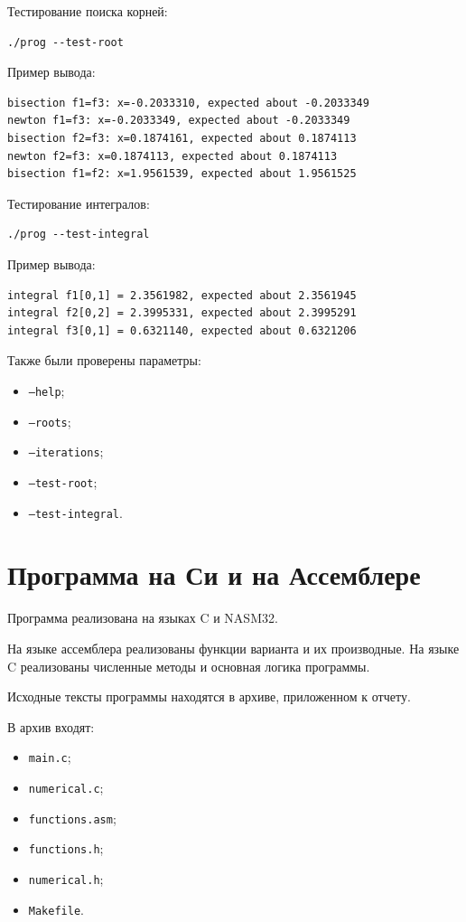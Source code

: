 \documentclass[a4paper,12pt]{article}
\begin{document}
Тестирование поиска корней:
\begin{lstlisting}
./prog --test-root
\end{lstlisting}

Пример вывода:
\begin{lstlisting}
bisection f1=f3: x=-0.2033310, expected about -0.2033349
newton f1=f3: x=-0.2033349, expected about -0.2033349
bisection f2=f3: x=0.1874161, expected about 0.1874113
newton f2=f3: x=0.1874113, expected about 0.1874113
bisection f1=f2: x=1.9561539, expected about 1.9561525
\end{lstlisting}

Тестирование интегралов:
\begin{lstlisting}
./prog --test-integral
\end{lstlisting}

Пример вывода:
\begin{lstlisting}
integral f1[0,1] = 2.3561982, expected about 2.3561945
integral f2[0,2] = 2.3995331, expected about 2.3995291
integral f3[0,1] = 0.6321140, expected about 0.6321206
\end{lstlisting}

Также были проверены параметры:
\begin{itemize}
    \item \texttt{--help};
    \item \texttt{--roots};
    \item \texttt{--iterations};
    \item \texttt{--test-root};
    \item \texttt{--test-integral}.
\end{itemize}

\newpage
\section{Программа на Си и на Ассемблере}
Программа реализована на языках C и NASM32.

На языке ассемблера реализованы функции варианта и их производные. На языке C реализованы численные методы и основная логика программы.

Исходные тексты программы находятся в архиве, приложенном к отчету.

В архив входят:
\begin{itemize}
    \item \texttt{main.c};
    \item \texttt{numerical.c};
    \item \texttt{functions.asm};
    \item \texttt{functions.h};
    \item \texttt{numerical.h};
    \item \texttt{Makefile}.
\end{itemize}
\end{document}

